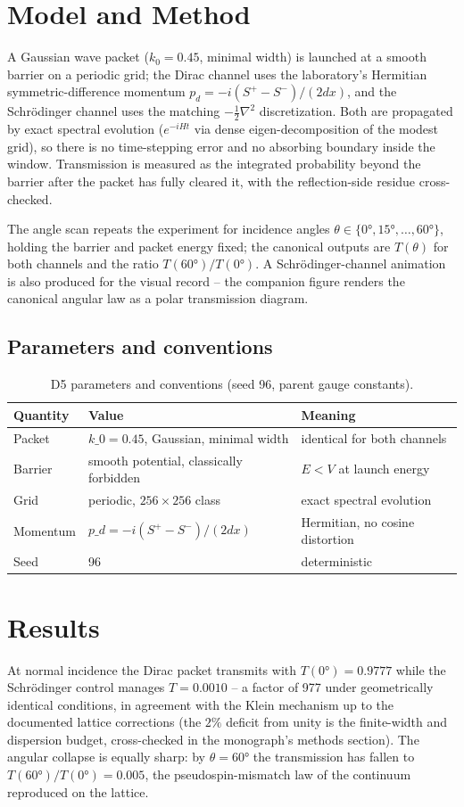 \documentclass[11pt,a4paper]{article}
\begin{document}
\section{Model and Method}
A Gaussian wave packet ($k_0 = 0.45$, minimal width) is launched at a smooth barrier on a periodic grid; the Dirac channel uses the laboratory's Hermitian symmetric-difference momentum $p_d = -i(S^+ - S^-)/(2dx)$, and the Schrödinger channel uses the matching $-\frac{1}{2}\nabla^2$ discretization. Both are propagated by exact spectral evolution ($e^{-iHt}$ via dense eigen-decomposition of the modest grid), so there is no time-stepping error and no absorbing boundary inside the window. Transmission is measured as the integrated probability beyond the barrier after the packet has fully cleared it, with the reflection-side residue cross-checked.

The angle scan repeats the experiment for incidence angles $\theta \in \{0°, 15°, \dots, 60°\}$, holding the barrier and packet energy fixed; the canonical outputs are $T(\theta)$ for both channels and the ratio $T(60°)/T(0°)$. A Schrödinger-channel animation is also produced for the visual record -- the companion figure renders the canonical angular law as a polar transmission diagram.

\subsection{Parameters and conventions}
\begin{table}[htbp]\centering\small
\begin{tabularx}{\columnwidth}{@{}l l X@{}}
\toprule
Quantity & Value & Meaning \\
\midrule
Packet & $k\_0 = 0.45$, Gaussian, minimal width & identical for both channels \\
Barrier & smooth potential, classically forbidden & $E < V$ at launch energy \\
Grid & periodic, $256\times256$ class & exact spectral evolution \\
Momentum & $p\_d = -i(S^+ - S^-)/(2dx)$ & Hermitian, no cosine distortion \\
Seed & 96 & deterministic \\
\bottomrule
\end{tabularx}
\caption{D5 parameters and conventions (seed 96, parent gauge constants).}
\end{table}

\section{Results}
At normal incidence the Dirac packet transmits with $T(0°) = 0.9777$ while the Schrödinger control manages $T = 0.0010$ -- a factor of 977 under geometrically identical conditions, in agreement with the Klein mechanism up to the documented lattice corrections (the $2\%$ deficit from unity is the finite-width and dispersion budget, cross-checked in the monograph's methods section). The angular collapse is equally sharp: by $\theta = 60°$ the transmission has fallen to $T(60°)/T(0°) = 0.005$, the pseudospin-mismatch law of the continuum reproduced on the lattice.
\end{document}
